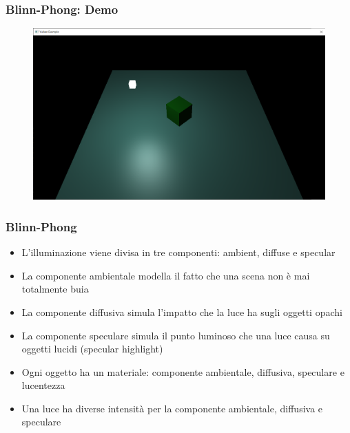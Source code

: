 \begin{frame}
\frametitle{Blinn-Phong: Demo}
\begin{figure}[ht]
    \centering
    \includegraphics[scale=0.25]{images/SlidesBlinnPhong/SceneMaterialsLight.png}
\end{figure}
\end{frame}

\begin{frame}
\frametitle{Blinn-Phong}
\begin{itemize}
\item L'illuminazione viene divisa in tre componenti: ambient, diffuse e specular
\item La componente ambientale modella il fatto che una scena non è mai totalmente buia
\item La componente diffusiva simula l'impatto che la luce ha sugli oggetti opachi
\item La componente speculare simula il punto luminoso che una luce causa su oggetti lucidi (specular highlight)
\item Ogni oggetto ha un materiale: componente ambientale, diffusiva, speculare e lucentezza
\item Una luce ha diverse intensità per la componente ambientale, diffusiva e speculare
\end{itemize}
\end{frame}
